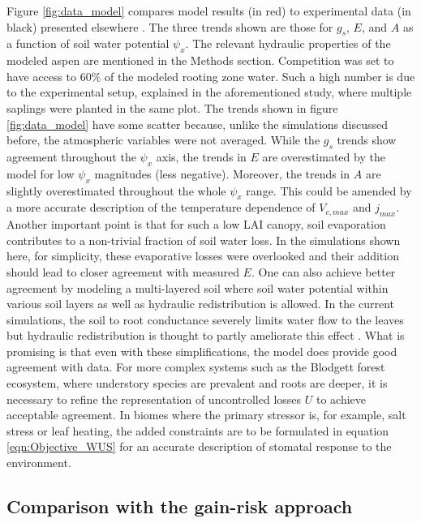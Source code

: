 \documentclass[utf8]{frontiersSCNS} %
\begin{document}
Figure \ref{fig:data_model} compares model results (in red) to experimental data (in black) presented elsewhere \citep{venturas_2018}. The three trends shown are those for $g_s$, $E$, and $A$ as a function of soil water potential $\psi_x$. The relevant hydraulic properties of the modeled aspen are mentioned in the Methods section. Competition was set to have access to $60\%$ of the modeled rooting zone water. Such a high number is due to the experimental setup, explained in the aforementioned study, where multiple saplings were planted in the same plot. The trends shown in figure \ref{fig:data_model} have some scatter because, unlike the simulations discussed before, the atmospheric variables were not averaged. While the $g_s$ trends show agreement throughout the $\psi_x$ axis, the trends in $E$ are overestimated by the model for low $\psi_x$ magnitudes (less negative). Moreover, the trends in $A$ are slightly overestimated throughout the whole $\psi_x$ range. This could be amended by a more accurate description of the temperature dependence of $V_{c,max}$ and $j_{max}$. Another important point is that for such a low LAI canopy, soil evaporation contributes to a non-trivial fraction of soil water loss. In the simulations shown here, for simplicity, these evaporative losses were overlooked and their addition should lead to closer agreement with measured $E$. One can also achieve better agreement by modeling a multi-layered soil where soil water potential within various soil layers as well as hydraulic redistribution is allowed. In the current simulations, the soil to root conductance severely limits water flow to the leaves but hydraulic redistribution is thought to partly ameliorate this effect \citep{huang_2017}. What is promising is that even with these simplifications, the model does provide good agreement with data. For more complex systems such as the Blodgett forest ecosystem, where understory species are prevalent and roots are deeper, it is necessary to refine the representation of uncontrolled losses $U$ to achieve acceptable agreement. In biomes where the primary stressor is, for example, salt stress or leaf heating, the added constraints are to be formulated in equation \ref{eqn:Objective_WUS} for an accurate description of stomatal response to the environment. 

\subsection{Comparison with the gain-risk approach}
\end{document}
